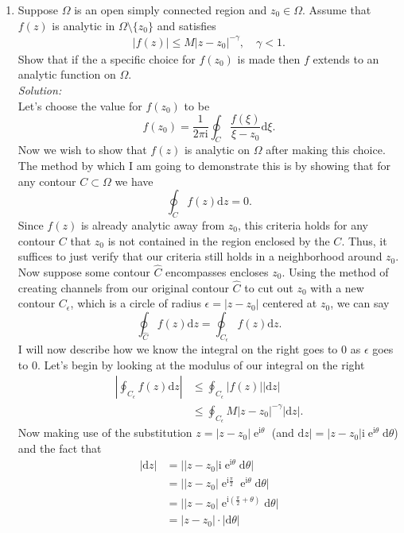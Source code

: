 \documentclass[10pt]{amsart}
\newcommand{\D}{\mathrm{d}}
\newcommand{\I}{\mathrm{i}}
\DeclareMathOperator{\E}{e}
\theoremstyle{nonumberplain}
\begin{document}
\begin{enumerate}[label={\bf {\arabic*}:}]
\item Suppose $\Omega$ is an open simply connected region and $z_0 \in
  \Omega$.  Assume that $f(z)$ is analytic in $\Omega\setminus
  \{z_0\}$ and satisfies
  \begin{align*}
    |f(z)| \leq M |z - z_0|^{-\gamma}, \quad \gamma < 1.
  \end{align*}
  Show that if the a specific choice for $f(z_0)$ is made then $f$
  extends to an analytic function on $\Omega$. \\
\textit{Solution:} \\
Let's choose the value for $f(z_0)$ to be
$$f(z_0) = \frac 1 {2 \pi \I}\oint_C \frac {f(\xi)} {\xi - z_0} \D \xi.$$
Now we wish to show that $f(z)$ is analytic on $\Omega$ after making this choice.
The method by which I am going to demonstrate this is by showing that for any contour $C \subset \Omega$ we have
$$
\oint_C f(z)\D z = 0.
$$
Since $f(z)$ is already analytic away from $z_0$, this criteria holds for any contour $C$ that $z_0$ is not contained in the region enclosed by the $C$.
Thus, it suffices to just verify that our criteria still holds in a neighborhood around $z_0$.
Now suppose some contour $\widehat C$ encompasses encloses $z_0$.
Using the method of creating channels from our original contour $\widehat C$ to cut out $z_0$ with a new contour $C_\epsilon$, which is a circle of radius $\epsilon = |z - z_0|$ centered at $z_0$, we can say
$$
\oint_{\widehat C} f(z)\D z = \oint_{C_\epsilon} f(z)\D z.
$$
I will now describe how we know the integral on the right goes to $0$ as $\epsilon$ goes to 0.
Let's begin by looking at the modulus of our integral on the right
\begin{align}
\left|\oint_{C_\epsilon} f(z)\D z \right| &\leq \oint_{C_\epsilon} \left|f(z)\right| \left|\D z \right| \nonumber \\
	&\leq \oint_{C_\epsilon} M |z - z_0|^{-\gamma} \left|\D z \right|.
\label{eq:step1}
\end{align}
Now making use of the substitution $z = |z - z_0| \E^{\I \theta}$ (and $\D z| = |z - z_0| \I \E^{\I \theta} \D \theta$) and the fact that
\begin{align*}
|\D z| &= \bigg||z - z_0| \I \E^{\I \theta} \D \theta\bigg| \\
	&= \bigg||z - z_0| \E^{\I \frac \pi 2} \E^{\I \theta} \D \theta\bigg| \\
	&= \bigg||z - z_0| \E^{\I \left(\frac \pi 2 + \theta\right)} \D \theta\bigg| \\
	&= |z - z_0|\cdot|\D \theta|
\end{align*}

\end{enumerate}
\end{document}
